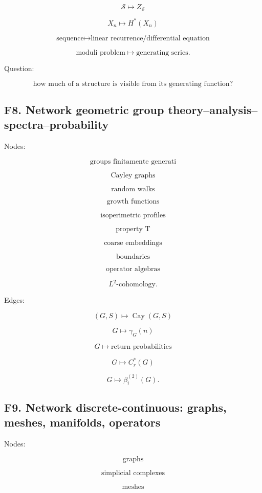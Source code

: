 \documentclass[11pt]{article}
\begin{document}
\[
\mathcal S\mapsto Z_{\mathcal S}
\]

\[
X_n\mapsto H^\ast(X_n)
\]

\[
\text{sequence}\mapsto \text{linear recurrence/differential equation}
\]

\[
\text{moduli problem}\mapsto \text{generating series}.
\]

Question:

\[
\text{how much of a structure is visible from its generating function?}
\]



\subsection{F8. Network geometric group theory--analysis--spectra--probability}

Nodes:

\[
\text{groups finitamente generati}
\]

\[
\text{Cayley graphs}
\]

\[
\text{random walks}
\]

\[
\text{growth functions}
\]

\[
\text{isoperimetric profiles}
\]

\[
\text{property T}
\]

\[
\text{coarse embeddings}
\]

\[
\text{boundaries}
\]

\[
\text{operator algebras}
\]

\[
L^2\text{-cohomology}.
\]

Edges:

\[
(G,S)\mapsto \operatorname{Cay}(G,S)
\]

\[
G\mapsto \gamma_G(n)
\]

\[
G\mapsto \text{return probabilities}
\]

\[
G\mapsto C^\ast_r(G)
\]

\[
G\mapsto \beta_i^{(2)}(G).
\]



\subsection{F9. Network discrete-continuous: graphs, meshes, manifolds, operators}

Nodes:

\[
\text{graphs}
\]

\[
\text{simplicial complexes}
\]

\[
\text{meshes}
\]
\end{document}
